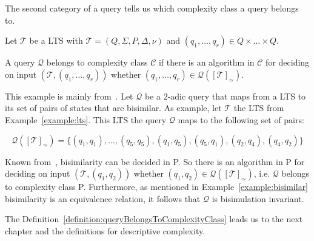 The second category of a query tells us which complexity class a query belongs to.

\begin{definition}
    \label{definition:queryBelongsToComplexityClass}
    Let $\mathcal{T}$ be a LTS with $\mathcal{T} = (Q, \Sigma, P, \Delta, \nu)$ and $(q_1, \dots, q_{r}) \in Q \times
    \dots \times Q$.

    A query $\mathcal{Q}$ belongs to complexity class $\mathcal{C}$ if there is an algorithm in $\mathcal{C}$ for
    deciding on input $(\mathcal{T}, (q_1, \dots, q_{r}))$ whether $(q_1, \dots, q_{r}) \in \mathcal{Q}
    ([\mathcal{T}]_\simeq)$.
\end{definition}

\begin{example}
    This example is mainly from~\cite{lange2014capturing}. Let $\mathcal{Q}$ be a $2$-adic query that maps from a
    LTS to its set of pairs of states that are bisimilar. As example, let $\mathcal{T}$ the LTS from
    Example~\ref{example:lts}. This LTS the query $\mathcal{Q}$ maps to the following set of pairs:

    \[\mathcal{Q}([\mathcal{T}]_\simeq) = \{(q_1, q_1), \dots, (q_5, q_5), (q_1, q_5), (q_5, q_1), (q_2, q_4), (q_4,
    q_2)\}\]

    Known from~\cite{lange2014capturing}, bisimilarity can be decided in P. So there is an algorithm in P for deciding on
    input $(\mathcal{T}, (q_1, q_2))$ whether $(q_1, q_2) \in \mathcal{Q}([\mathcal{T}]_\simeq)$, i.e. $\mathcal{Q}$
    belongs to complexity class P. Furthermore, as mentioned in Example~\ref{example:bisimilar} bisimilarity is an
    equivalence relation, it follows that $\mathcal{Q}$ is bisimulation invariant.
\end{example}

The Definition~\ref{definition:queryBelongsToComplexityClass} leads us to the next chapter and the definitions for
descriptive complexity.